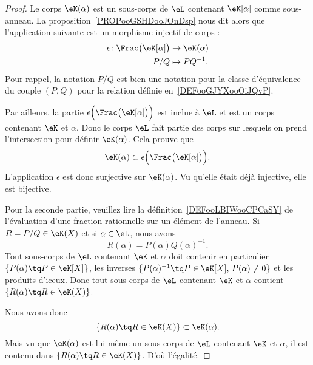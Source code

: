 \begin{proof}
    Le corps \( \eK(\alpha)\) est un sous-corps de \( \eL\) contenant \( \eK[\alpha]\) comme sous-anneau. La proposition~\ref{PROPooGSHDooJOnDsp} nous dit alors que l'application suivante est un morphisme injectif de corps :
    \begin{equation}
        \begin{aligned}
            \epsilon\colon \Frac\big( \eK[\alpha] \big)&\to \eK(\alpha) \\
            P/Q&\mapsto PQ^{-1}.
        \end{aligned}
    \end{equation}
    Pour rappel, la notation \( P/Q\) est bien une notation pour la classe d'équivalence du couple \( (P,Q)\) pour la relation définie en~\ref{DEFooGJYXooOiJQvP}.

    Par ailleurs, la partie \( \epsilon\Big( \Frac\big( \eK[\alpha] \big) \Big) \) est inclue à \( \eL\) et est un corps contenant \( \eK\) et \( \alpha\). Donc le corps \( \eL\) fait partie des corps sur lesquels on prend l'intersection pour définir \( \eK(\alpha)\). Cela prouve que
    \begin{equation}
        \eK(\alpha)\subset  \epsilon\Big( \Frac\big( \eK[\alpha] \big) \Big).
    \end{equation}
    L'application \( \epsilon\) est donc surjective sur \( \eK(\alpha)\). Vu qu'elle était déjà injective, elle est bijective.

    Pour la seconde partie, veuillez lire la définition~\ref{DEFooLBIWooCPCaSY} de l'évaluation d'une fraction rationnelle sur un élément de l'anneau. Si \( R=P/Q\in \eK(X)\) et si \( \alpha\in \eL\), nous avons
    \begin{equation}
        R(\alpha)=P(\alpha)Q(\alpha)^{-1}.
    \end{equation}
    Tout sous-corps de \( \eL\) contenant \( \eK\) et \( \alpha\) doit contenir en particulier \( \{ P(\alpha)\tq P\in \eK[X] \} \), les inverses \( \{ P(\alpha)^{-1}\tq P\in \eK[X],\,P(\alpha)\neq 0 \}\) et les produits d'iceux. Donc tout sous-corps de \( \eL\) contenant \( \eK\) et \( \alpha\) contient \( \{ R(\alpha)\tq R\in \eK(X) \}\).

    Nous avons donc
    \begin{equation}
        \{ R(\alpha)\tq R\in \eK(X) \}\subset \eK(\alpha).
    \end{equation}
    Mais vu que \( \eK(\alpha)\) est lui-même un sous-corps de \( \eL\) contenant \( \eK\) et \( \alpha\), il est contenu dans \( \{ R(\alpha)\tq R\in \eK(X) \}\). D'où l'égalité.
\end{proof}

